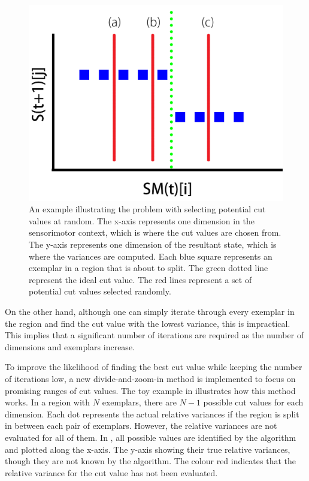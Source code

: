 \begin{figure}[htb]
	\centering
	\includegraphics[width=0.7 \textwidth]{"fig/cbla/bad-cut-example"}
	\caption[An example of making undesirable cuts using randomly selection method]{An example illustrating the problem with selecting potential cut values at random. The x-axis represents one dimension in the sensorimotor context, which is where the cut values are chosen from. The y-axis represents one dimension of the resultant state, which is where the variances are computed. Each blue square represents an exemplar in a region that is about to split. The green dotted line represent the ideal cut value. The red lines represent a set of potential cut values selected randomly.}
	\label{fig:bad-cut-example}
\end{figure}

On the other hand, although one can simply iterate through every exemplar in the region and find the cut value with the lowest variance, this is impractical. This implies that a significant number of iterations are required as the number of dimensions and exemplars increase. 

To improve the likelihood of finding the best cut value while keeping the number of iterations low, a new divide-and-zoom-in method is implemented to focus on promising ranges of cut values. The toy example in  illustrates how this method works. In a region with $N$ exemplars, there are $N-1$ possible cut values for each dimension. Each dot represents the actual relative variances if the region is split in between each pair of exemplars. However, the relative variances are not evaluated for all of them. In , all possible values are identified by the algorithm and plotted along the x-axis. The y-axis showing their true relative variances, though they are not known by the algorithm. The colour red indicates that the relative variance for the cut value has not been evaluated. 

